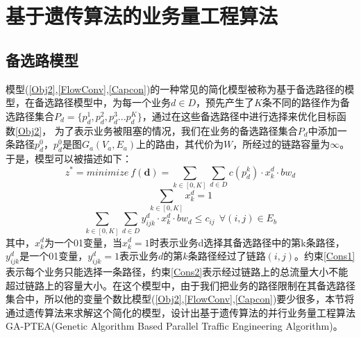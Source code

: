\section{基于遗传算法的业务量工程算法}
\subsection{备选路模型}
模型(\ref{Obj2},\ref{FlowConv},\ref{Capcon})的一种常见的简化模型被称为基于备选路径的模型，在备选路径模型中，为每一个业务$d \in D$，预先产生了$K$条不同的路径作为备选路径集合$P_d=\{p^1_d,p^2_d,p^3_d...p^K_d\}$，通过在这些备选路径中进行选择来优化目标函数\ref{Obj2}，
为了表示业务被阻塞的情况，我们在业务的备选路径集合$P_d$中添加一条路径$p^0_d$，$p_d^0$是图$G_a(V_a,E_a)$上的路由，其代价为$W$，所经过的链路容量为$\infty$。于是，模型可以被描述如下：
\begin{equation}\label{Obj3}
z^* = minimize~f(\mathbf{d})=
\sum\limits_{k \in [0,K]}\sum\limits_{d \in D} c(p_d^k)\cdot x_k^d\cdot bw_d
\end{equation}
\begin{equation}\label{Cons1}
\sum\limits_{k \in [0,K]}x_k^d=1
\end{equation}
\begin{equation}\label{Cons2}
\sum\limits_{k \in [0,K]}\sum\limits_{d \in D} y_{ijk}^d\cdot x_k^d\cdot bw_d\le c_{ij} ~~\forall (i,j)\in E_b
\end{equation}
其中，$x_k^d$为一个01变量，当$x_k^d=1$时表示业务d选择其备选路径中的第k条路径，$y_{ijk}^d$是一个01变量，$y_{ijk}^d=1$表示业务$d$的第$k$条路径经过了链路$(i,j)$。约束\ref{Cons1}表示每个业务只能选择一条路径，约束\ref{Cons2}表示经过链路上的总流量大小不能超过链路上的容量大小。在这个模型中，由于我们把业务的路径限制在其备选路径集合中，所以他的变量个数比模型(\ref{Obj2},\ref{FlowConv},\ref{Capcon})要少很多，本节将通过遗传算法来求解这个简化的模型，设计出基于遗传算法的并行业务量工程算法GA-PTEA(Genetic Algorithm Based Parallel Traffic Engineering Algorithm)。

